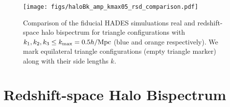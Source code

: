 \begin{figure}
\begin{center}
    \texttt{[image: figs/haloBk\_amp\_kmax05\_rsd\_comparison.pdf]}
    \caption{Comparison of the fiducial HADES simuluations real and redshift-space halo
    bispectrum for triangle configurations with $k_1, k_2, k_3 \leq k_{\rm max} = 0.5 h/{\rm Mpc}$ 
    (blue and orange respectively). We mark equilateral triangle configurations (empty 
    triangle marker) along with their side lengths $k$.
    }
\label{fig:real_vs_rsd}
\end{center}
\end{figure}
\section{Redshift-space Halo Bispectrum} 
